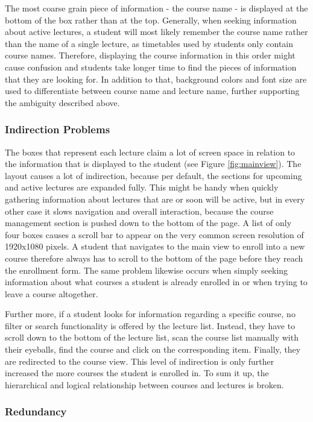 The most coarse grain piece of information - the course name - is displayed at the bottom of the box rather than at the top. Generally, when seeking information about active lectures, a student will most likely remember the course name rather than the name of a single lecture, as timetables used by students only contain course names. Therefore, displaying the course information in this order might cause confusion and students take longer time to find the pieces of information that they are looking for.
In addition to that, background colors and font size are used to differentiate between course name and lecture name, further supporting the ambiguity described above.

\subsubsection{Indirection Problems}

The boxes that represent each lecture claim a lot of screen space in relation to the information that is displayed to the student (see Figure \ref{fig:mainview}). The layout causes a lot of indirection, because per default, the sections for upcoming and active lectures are expanded fully. This might be handy when quickly gathering information about lectures that are or soon will be active, but in every other case it slows navigation and overall interaction, because the course management section is pushed down to the bottom of the page.
A list of only four boxes causes a scroll bar to appear on the very common screen resolution of 1920x1080 pixels. A student that navigates to the main view to enroll into a new course therefore always has to scroll to the bottom of the page before they reach the enrollment form. The same problem likewise occurs when simply seeking information about what courses a student is already enrolled in or when trying to leave a course altogether. 

Further more, if a student looks for information regarding a specific course, no filter or search functionality is offered by the lecture list. Instead, they have to scroll down to the bottom of the lecture list, scan the course list manually with their eyeballs, find the course and click on the corresponding item. Finally, they are redirected to the course view. This level of indirection is only further increased the more courses the student is enrolled in. 
To sum it up, the hierarchical and logical relationship between courses and lectures is broken. 

\subsubsection{Redundancy}

